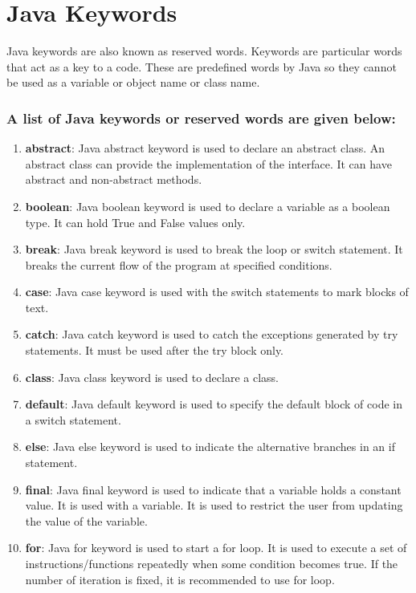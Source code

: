 \documentclass[twocolumn, a4paper]{article}
\begin{document}
\section{Java Keywords}
Java keywords are also known as reserved words. Keywords are particular words
that act as a key to a code. These are predefined words by Java so they cannot
be used as a variable or object name or class name.

\subsubsection{A list of Java keywords or reserved words are given below:}
\begin{enumerate}%
  \item \textbf{abstract}: Java abstract keyword is used to declare an abstract class. An abstract class can provide the implementation of the interface. It can have abstract and non-abstract methods.
  \item \textbf{boolean}: Java boolean keyword is used to declare a variable as a boolean type. It can hold True and False values only.
  \item \textbf{break}: Java break keyword is used to break the loop or switch statement. It breaks the current flow of the program at specified conditions.
  \item \textbf{case}: Java case keyword is used with the switch statements to mark blocks of text.
  \item \textbf{catch}: Java catch keyword is used to catch the exceptions generated by try statements. It must be used after the try block only.
  \item \textbf{class}: Java class keyword is used to declare a class.
  \item \textbf{default}: Java default keyword is used to specify the default block of code in a switch statement.
  \item \textbf{else}: Java else keyword is used to indicate the alternative branches in an if statement.
  \item \textbf{final}: Java final keyword is used to indicate that a variable holds a constant value. It is used with a variable. It is used to restrict the user from updating the value of the variable.
  \item \textbf{for}: Java for keyword is used to start a for loop. It is used to execute a set of instructions/functions repeatedly when some condition becomes true. If the number of iteration is fixed, it is recommended to use for loop.
\end{enumerate}%
\end{document}
